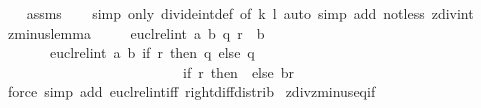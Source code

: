 \begin{isabellebody}
%
\isadelimproof
\ \ %
\endisadelimproof
%
\isatagproof
{}\isamarkupfalse%
\ assms\isanewline
\ \ \isamarkupfalse%
\ {\isacharparenleft}{\kern0pt}simp\ only{\isacharcolon}{\kern0pt}\ divide{\isacharunderscore}{\kern0pt}int{\isacharunderscore}{\kern0pt}def\ {\isacharbrackleft}{\kern0pt}of\ k\ l{\isacharbrackright}{\kern0pt}{\isacharcomma}{\kern0pt}\ auto\ simp\ add{\isacharcolon}{\kern0pt}\ not{\isacharunderscore}{\kern0pt}less\ zdiv{\isacharunderscore}{\kern0pt}int{\isacharparenright}{\kern0pt}%
\endisatagproof
{\isafoldproof}%
%
\isadelimproof
%
\endisadelimproof
%
\isadelimdocument
%
\endisadelimdocument
%
\isatagdocument
%
\isamarkuptrue%
%
\endisatagdocument
{\isafolddocument}%
%
\isadelimdocument
%
\endisadelimdocument
{}\isamarkupfalse%
\ zminus{}{\isacharunderscore}{\kern0pt}lemma{\isacharcolon}{\kern0pt}\isanewline
\ \ \ \ \ {\isachardoublequoteopen}eucl{\isacharunderscore}{\kern0pt}rel{\isacharunderscore}{\kern0pt}int\ a\ b\ {\isacharparenleft}{\kern0pt}q{\isacharcomma}{\kern0pt}\ r{\isacharparenright}{\kern0pt}\ {\isacharequal}{\kern0pt}{\isacharequal}{\kern0pt}{\isachargreater}{\kern0pt}\ b\ {\isasymnoteq}\ {}\isanewline
\ \ \ \ \ \ {\isacharequal}{\kern0pt}{\isacharequal}{\kern0pt}{\isachargreater}{\kern0pt}\ eucl{\isacharunderscore}{\kern0pt}rel{\isacharunderscore}{\kern0pt}int\ {\isacharparenleft}{\kern0pt}{\isacharminus}{\kern0pt}a{\isacharparenright}{\kern0pt}\ b\ {\isacharparenleft}{\kern0pt}if\ r{\isacharequal}{\kern0pt}{}\ then\ {\isacharminus}{\kern0pt}q\ else\ {\isacharminus}{\kern0pt}q\ {\isacharminus}{\kern0pt}\ {}{\isacharcomma}{\kern0pt}\isanewline
\ \ \ \ \ \ \ \ \ \ \ \ \ \ \ \ \ \ \ \ \ \ \ \ \ \ if\ r{\isacharequal}{\kern0pt}{}\ then\ {}\ else\ b{\isacharminus}{\kern0pt}r{\isacharparenright}{\kern0pt}{\isachardoublequoteclose}\isanewline
%
\isadelimproof
%
\endisadelimproof
%
\isatagproof
{}\isamarkupfalse%
\ {\isacharparenleft}{\kern0pt}force\ simp\ add{\isacharcolon}{\kern0pt}\ eucl{\isacharunderscore}{\kern0pt}rel{\isacharunderscore}{\kern0pt}int{\isacharunderscore}{\kern0pt}iff\ right{\isacharunderscore}{\kern0pt}diff{\isacharunderscore}{\kern0pt}distrib{\isacharparenright}{\kern0pt}%
\endisatagproof
{\isafoldproof}%
%
\isadelimproof
\isanewline
%
\endisadelimproof
\isanewline
\isanewline
{}\isamarkupfalse%
\ zdiv{\isacharunderscore}{\kern0pt}zminus{}{\isacharunderscore}{\kern0pt}eq{\isacharunderscore}{\kern0pt}if{\isacharcolon}{\kern0pt}\isanewline

\end{isabellebody}
